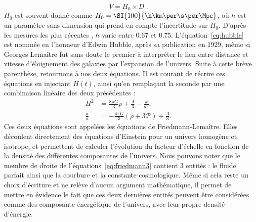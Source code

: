 \begin{equation}
  \label{eq:hubble}
  V = H_0 \times D  \; .
\end{equation}
$H_0$ est souvent donné comme $H_{0} = \SI{100}{\h\km\per\s\per\Mpc}$, où $h$ est un paramètre sans dimension qui prend en compte l'incertitude sur $H_0$. D'après les mesures les plus récentes \autocite{Collaboration2018,Riess2019}, $h$ varie entre $\num{0,67}$ et $\num{0,75}$.
L'équation~\ref{eq:hubble} est nommée en l'honneur d'Edwin Hubble, après sa publication en 1929, même si Georges Lemaître fut sans doute le premier à interpréter le lien entre distance et vitesse d'éloignement des galaxies par l'expansion de l'univers.
Suite à cette brève parenthèse, retournons à nos deux équations. Il est courant de récrire ces équations en injectant $H(t)$, ainsi qu'en remplaçant la seconde par une combinaison linéaire des deux précédentes :
\begin{align}
  \label{eq:friedmann3}
  H^2 &= \frac{8 \pi G}{3} \rho + \frac{\Lambda}{3} - \frac{k}{a^2} ,\\
  \label{eq:friedmann4}
  \frac{\ddot{a}}{a} &= - \frac{4 \pi G}{3} (\rho + 3 \mathcal{P}) + \frac{\Lambda}{3} .
\end{align}
Ces deux équations sont appelées les équations de Friedmann-Lemaître. Elles découlent directement des équations d'Einstein pour un univers homogène et isotrope,
et permettent de calculer l'évolution du facteur d'échelle en fonction de la densité des différentes composantes de l'univers.
Nous pouvons noter que le membre de droite de l'équations~\ref{eq:friedmann3} contient 3 entités : le fluide parfait ainsi que la courbure et la constante cosmologique. Même si cela reste un choix d'écriture et ne relève d'aucun argument mathématique, il permet de mettre en évidence le fait que ces deux dernières entités peuvent être considérées comme des composante énergétique de l'univers, avec leur propre densité d'énergie.


